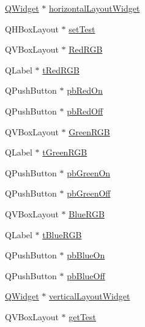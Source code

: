 \begin{DoxyCompactItemize}
\item 
\hyperlink{class_q_widget}{Q\+Widget} $\ast$ \hyperlink{class_ui___spi_test_program_a8d9662f61dc85ce78495602f1d03006f}{horizontal\+Layout\+Widget}
\item 
Q\+H\+Box\+Layout $\ast$ \hyperlink{class_ui___spi_test_program_ab40f35f9bcce17af63ba573e1e8ee485}{set\+Test}
\item 
Q\+V\+Box\+Layout $\ast$ \hyperlink{class_ui___spi_test_program_a266d140f4ccd88877aee1b242908b21d}{Red\+R\+GB}
\item 
Q\+Label $\ast$ \hyperlink{class_ui___spi_test_program_a44f9277d36451995887541d6e333c772}{t\+Red\+R\+GB}
\item 
Q\+Push\+Button $\ast$ \hyperlink{class_ui___spi_test_program_a58972344360380ab7a3cedec6de9fb0d}{pb\+Red\+On}
\item 
Q\+Push\+Button $\ast$ \hyperlink{class_ui___spi_test_program_ad6661caed9d7154252ff188ea62e538c}{pb\+Red\+Off}
\item 
Q\+V\+Box\+Layout $\ast$ \hyperlink{class_ui___spi_test_program_a45540b28778c355f4e372566eb065ef3}{Green\+R\+GB}
\item 
Q\+Label $\ast$ \hyperlink{class_ui___spi_test_program_a56e39ae0021a6fba651282c09e6d38da}{t\+Green\+R\+GB}
\item 
Q\+Push\+Button $\ast$ \hyperlink{class_ui___spi_test_program_aa00d405e11fadc9dd8d0b7aae2632903}{pb\+Green\+On}
\item 
Q\+Push\+Button $\ast$ \hyperlink{class_ui___spi_test_program_ad4aa6f2ff845832ee96f6158c85bbfba}{pb\+Green\+Off}
\item 
Q\+V\+Box\+Layout $\ast$ \hyperlink{class_ui___spi_test_program_ac0ff6df3d4236129efdc0762eed715f4}{Blue\+R\+GB}
\item 
Q\+Label $\ast$ \hyperlink{class_ui___spi_test_program_a24f37f517fcdcba9802de32d4cb7cd2a}{t\+Blue\+R\+GB}
\item 
Q\+Push\+Button $\ast$ \hyperlink{class_ui___spi_test_program_a3f13697eb9ebac3370cf5b1456bb2ab6}{pb\+Blue\+On}
\item 
Q\+Push\+Button $\ast$ \hyperlink{class_ui___spi_test_program_add50c8a20a19c966af33418b767fb815}{pb\+Blue\+Off}
\item 
\hyperlink{class_q_widget}{Q\+Widget} $\ast$ \hyperlink{class_ui___spi_test_program_a4dab2ee47678bbea22fe10267a009293}{vertical\+Layout\+Widget}
\item 
Q\+V\+Box\+Layout $\ast$ \hyperlink{class_ui___spi_test_program_a6d63969ee767e7e499a5c6abd4424553}{get\+Test}

\end{DoxyCompactItemize}
